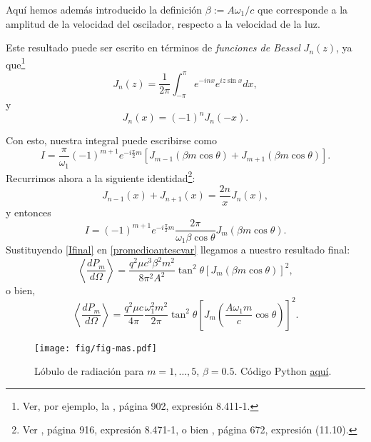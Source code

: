 Aquí hemos además introducido la definición $\beta:={A\omega_1}/{c}$ que
corresponde a la amplitud de la velocidad del oscilador, respecto a la velocidad
de la luz.

Este resultado puede ser escrito en términos de \textit{funciones de Bessel}
$J_n(z)$, ya que\footnote{Ver, por ejemplo, la \cite{GR00}, página
902, expresión 8.411-1.}
\begin{equation}
J_{n}(z)  =\frac{1}{2\pi}\int_{-\pi}^{\pi}e^{-inx}e^{iz\sin x}dx ,
\end{equation}
y
\begin{equation}
 J_n(x)=(-1)^nJ_n(-x).
\end{equation}

Con esto, nuestra integral puede escribirse como
\begin{equation}
I=\frac{\pi}{\omega_1}(-1)^{m+1}e^{-i\frac{\pi}{2}m}\left[J_{m-1}\left(\beta
m\cos\theta\right)+J_{m+1}\left(\beta m\cos\theta\right)  \right]  .
\end{equation}
Recurrimos ahora a la siguiente identidad\footnote{Ver \cite{GR00}, página 916, expresión 8.471-1, o bien \cite{AW01}, página 672, expresión (11.10).}:
\begin{equation}
J_{n-1}(x)  +J_{n+1}(x)  =\frac{2n}{x}J_{n}\left(
x\right)  ,
\end{equation}
y entonces
\begin{equation}\label{Ifinal}
I=(-1)^{m+1}e^{-i\frac{\pi}{2}m}\frac{2\pi}{\omega_1\beta\cos\theta}J_{m}\left(  \beta m\cos\theta\right).
\end{equation}
Sustituyendo \eqref{Ifinal} en \eqref{promedioantescvar} llegamos a nuestro
resultado final:
\begin{equation}
\left\langle \frac{dP_{m}}{d\Omega}\right\rangle
=\frac{q^2\mu c^3\beta^2m^2}{8\pi^2 A^2}\tan^2\theta\left[J_{m}\left(\beta
m\cos\theta\right)\right]^2,
\end{equation}
o bien,
\begin{equation}
\boxed{\left\langle \frac{dP_{m}}{d\Omega}\right\rangle
=\frac{q^2\mu c}{4\pi}\frac{\omega_1^2m^2}{2\pi}\tan^2\theta\left[ J_{m}\left(\frac{A\omega_1
m}{c}\cos\theta\right)  \right]^2.}
\end{equation}
\begin{figure}[ht]
\centerline{\texttt{[image: fig/fig-mas.pdf]}}
\caption{Lóbulo de radiación para $m=1,\dots,5$, $\beta=0.5$. Código Python \href{https://github.com/gfrubi/electrodinamica/blob/master/figuras-editables/fig-mas.py}{aquí}.}
\label{TER2}
\end{figure}
